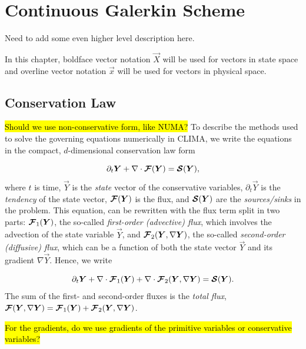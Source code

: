 \documentclass{report}
\numberwithin{equation}{section}
\begin{document}
\section{Continuous Galerkin Scheme}

Need to add some even higher level description here.

In this chapter, boldface vector notation $\vec X$ will be used for vectors in state space and overline vector notation $\vec x$ will be used for vectors in physical space. 

\subsection{Conservation Law}
\hl{Should we use non-conservative form, like NUMA?}
To describe the methods used to solve the governing equations numerically in CLIMA, we write the equations in the compact, $d$-dimensional conservation law form 

\begin{equation}\label{eq:cg_aconservation_law}
    \partial_t \boldsymbol{{Y}} 
    + \nabla \cdot \boldsymbol{{\mathcal{F}}}(\boldsymbol{{Y}}) 
    = \boldsymbol{{\mathcal{S}}}(\boldsymbol{{Y}}),
\end{equation}
where $t$ is time, $\vec Y$ is the \emph{state} vector of the conservative variables, $\partial_t \vec{Y}$ is the \emph{tendency} of the state vector, $\boldsymbol{{\mathcal{F}}} (\boldsymbol{{Y}})$ is the flux, and $\boldsymbol{{\mathcal{S}}}(\boldsymbol{{Y}})$ are the \emph{sources/sinks} in the problem. This equation, can be rewritten with the flux term split in two parts:  $\boldsymbol{{\mathcal{F}}}_1 (\boldsymbol{{Y}})$, the so-called \emph{first-order (advective) flux}, which involves the advection of the state variable $\vec Y$, and $\boldsymbol{{\mathcal{F}}}_2 (\boldsymbol{{Y}}, \nabla \boldsymbol{{Y}})$, the so-called \emph{second-order (diffusive) flux}, which can be a function of both the state vector $\vec Y$ and its gradient $\nabla \vec Y$. Hence, we write

\begin{equation}\label{eq:cg_advection_diffusion_source}
    \partial_t \boldsymbol{{Y}} 
    + \nabla \cdot \boldsymbol{{\mathcal{F}}}_1 (\boldsymbol{{Y}}) 
    + \nabla \cdot \boldsymbol{{\mathcal{F}}}_2 (\boldsymbol{{Y}}, \nabla \boldsymbol{{Y}}) 
    = \boldsymbol{{\mathcal{S}}}(\boldsymbol{{Y}}).
\end{equation}
The sum of the first- and second-order fluxes is the \emph{total flux}, $\boldsymbol{{\mathcal{F}}}(\boldsymbol{{Y}}, \nabla \boldsymbol{{Y}}) = \boldsymbol{{\mathcal{F}}}_1(\boldsymbol{{Y}}) + \boldsymbol{{\mathcal{F}}}_2(\boldsymbol{{Y}}, \nabla \boldsymbol{{Y}})$.

\hl{For the gradients, do we use gradients of the primitive variables or conservative variables?}
\end{document}
